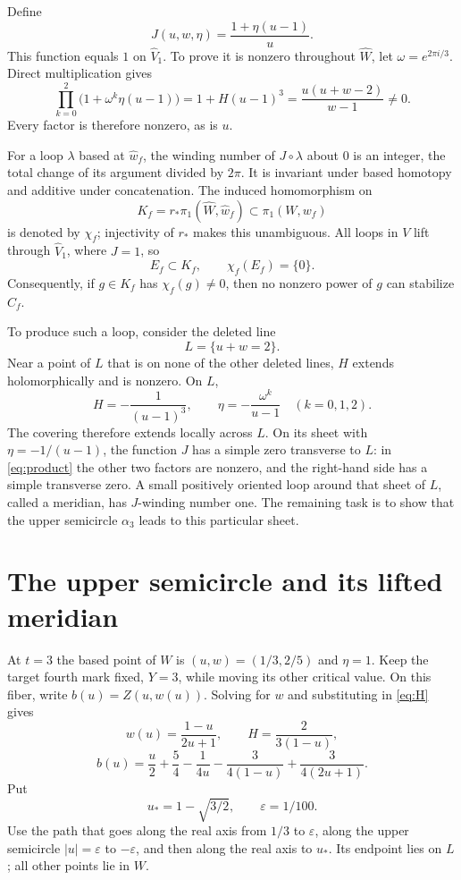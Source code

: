 \documentclass[11pt]{article}
\theoremstyle{remark}
\begin{document}

Define
\begin{equation}\label{eq:J}
 J(u,w,\eta)=\frac{1+\eta(u-1)}u.
\end{equation}
This function equals $1$ on $\widehat V_1$. To prove it is nonzero throughout $\widehat W$, let $\omega=e^{2\pi i/3}$. Direct multiplication gives
\begin{equation}\label{eq:product}
 \prod_{k=0}^2\bigl(1+\omega^k\eta(u-1)\bigr)
 =1+H(u-1)^3=\frac{u(u+w-2)}{w-1}\ne0.
\end{equation}
Every factor is therefore nonzero, as is $u$.

For a loop $\lambda$ based at $\widehat w_f$, the winding number of $J\circ\lambda$ about $0$ is an integer, the total change of its argument divided by $2\pi$. It is invariant under based homotopy and additive under concatenation. The induced homomorphism on
\[
 K_f=r_*\pi_1(\widehat W,\widehat w_f)\subset\pi_1(W,w_f)
\]
is denoted by $\chi_f$; injectivity of $r_*$ makes this unambiguous. All loops in $V$ lift through $\widehat V_1$, where $J=1$, so
\begin{equation}\label{eq:vanishes}
 E_f\subset K_f,\qquad \chi_f(E_f)=\{0\}.
\end{equation}
Consequently, if $g\in K_f$ has $\chi_f(g)\ne0$, then no nonzero power of $g$ can stabilize $C_f$.

To produce such a loop, consider the deleted line
\[
 L=\{u+w=2\}.
\]
Near a point of $L$ that is on none of the other deleted lines, $H$ extends holomorphically and is nonzero. On $L$,
\[
 H=-\frac1{(u-1)^3},\qquad
 \eta=-\frac{\omega^k}{u-1}\quad(k=0,1,2).
\]
The covering therefore extends locally across $L$. On its sheet with $\eta=-1/(u-1)$, the function $J$ has a simple zero transverse to $L$: in \eqref{eq:product} the other two factors are nonzero, and the right-hand side has a simple transverse zero. A small positively oriented loop around that sheet of $L$, called a meridian, has $J$-winding number one. The remaining task is to show that the upper semicircle $\alpha_3$ leads to this particular sheet.

\section{The upper semicircle and its lifted meridian}
At $t=3$ the based point of $W$ is $(u,w)=(1/3,2/5)$ and $\eta=1$. Keep the target fourth mark fixed, $Y=3$, while moving its other critical value. On this fiber, write $b(u)=Z(u,w(u))$. Solving for $w$ and substituting in \eqref{eq:H} gives
\begin{equation}\label{eq:fiber}
 w(u)=\frac{1-u}{2u+1},\qquad H=\frac2{3(1-u)},
\end{equation}
\begin{equation}\label{eq:bu}
 b(u)=\frac u2+\frac54-\frac1{4u}
             -\frac3{4(1-u)}+\frac3{4(2u+1)}.
\end{equation}
Put
\[
 u_*=1-\sqrt{3/2},\qquad \varepsilon=1/100.
\]
Use the path that goes along the real axis from $1/3$ to $\varepsilon$, along the upper semicircle $|u|=\varepsilon$ to $-\varepsilon$, and then along the real axis to $u_*$. Its endpoint lies on $L$; all other points lie in $W$.
\end{document}
